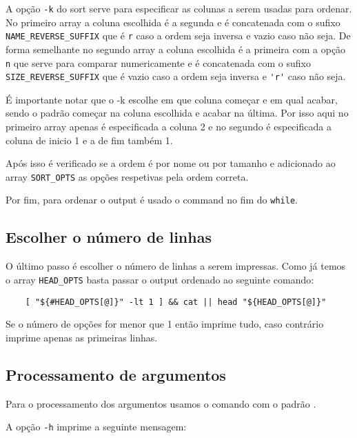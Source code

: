 A opção \Verb|-k| do sort serve para especificar as colunas a serem usadas para ordenar.
No primeiro array a coluna escolhida é a segunda e é concatenada com o sufixo \Verb|NAME_REVERSE_SUFFIX| que é \Verb|r| caso a ordem seja inversa e vazio caso não seja.
De forma semelhante no segundo array a coluna escolhida é a primeira com a opção \Verb|n| que serve para comparar numericamente e é concatenada com o sufixo \Verb|SIZE_REVERSE_SUFFIX| que é vazio caso a ordem seja inversa e \Verb|'r'| caso não seja.

É importante notar que o -k escolhe em que coluna começar e em qual acabar, sendo o padrão começar na coluna escolhida e acabar na última.
Por isso aqui no primeiro array apenas é especificada a coluna 2 e no segundo é especificada a coluna de inicio 1 e a de fim também 1.

Após isso é verificado se a ordem é por nome ou por tamanho e adicionado ao array \Verb|SORT_OPTS| as opções respetivas pela ordem correta.

Por fim, para ordenar o output é usado o command  no fim do \Verb|while|.

\subsection{Escolher o número de linhas}\label{sec:implementation_head}

O último passo é escolher o número de linhas a serem impressas.
Como já temos o array \Verb|HEAD_OPTS| basta passar o output ordenado ao seguinte comando:

\begin{listing}[H]
	\centering
	\begin{verbatim}
    [ "${#HEAD_OPTS[@]}" -lt 1 ] && cat || head "${HEAD_OPTS[@]}"
  \end{verbatim}
\end{listing}

Se o número de opções for menor que 1 então imprime tudo, caso contrário imprime apenas as primeiras linhas.


\subsection{Processamento de argumentos}

Para o processamento dos argumentos usamos o comando  com o padrão .

A opção \Verb|-h| imprime a seguinte mensagem:

